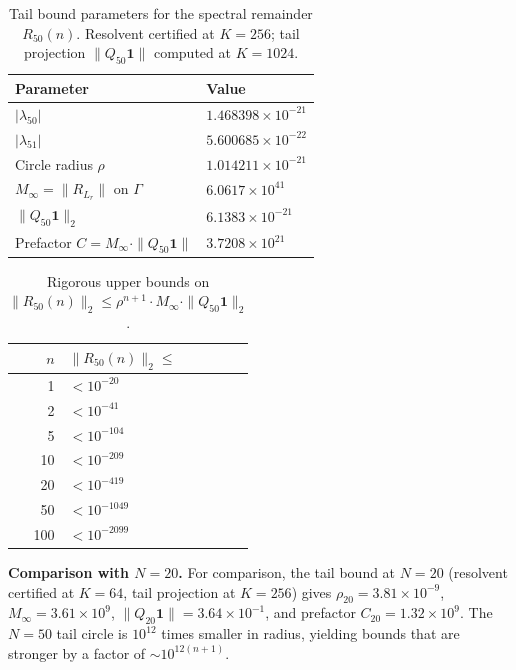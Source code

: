 \documentclass[11pt]{article}
\begin{document}
\begin{table}[ht]
\centering
\caption{Tail bound parameters for the spectral remainder $R_{50}(n)$.
Resolvent certified at $K = 256$; tail projection $\|Q_{50}\mathbf{1}\|$ computed at $K=1024$.}
\label{tab:tail-bound}
\begin{tabular}{ll}
\toprule
Parameter & Value \\
\midrule
$|\lambda_{50}|$ & $1.468398 \times 10^{-21}$ \\
$|\lambda_{51}|$ & $5.600685 \times 10^{-22}$ \\
Circle radius $\rho$ & $1.014211 \times 10^{-21}$ \\
$M_\infty = \|R_{L_r}\|$ on $\Gamma$ & $6.0617 \times 10^{41}$ \\
$\|Q_{50} \mathbf{1}\|_2$ & $6.1383 \times 10^{-21}$ \\
Prefactor $C = M_\infty \cdot \|Q_{50}\mathbf{1}\|$ & $3.7208 \times 10^{21}$ \\
\bottomrule
\end{tabular}
\end{table}

\begin{table}[ht]
\centering
\caption{Rigorous upper bounds on $\|R_{50}(n)\|_2 \leq \rho^{n+1} \cdot M_\infty \cdot \|Q_{50}\mathbf{1}\|_2$.}
\label{tab:tail-bounds-sample}
\begin{tabular}{rl}
\toprule
$n$ & $\|R_{50}(n)\|_2 \leq$ \\
\midrule
1 & $< 10^{-20}$ \\
2 & $< 10^{-41}$ \\
5 & $< 10^{-104}$ \\
10 & $< 10^{-209}$ \\
20 & $< 10^{-419}$ \\
50 & $< 10^{-1049}$ \\
100 & $< 10^{-2099}$ \\
\bottomrule
\end{tabular}
\end{table}

\medskip\noindent
\textbf{Comparison with $N = 20$.}
For comparison, the tail bound at $N = 20$ (resolvent certified at $K = 64$,
tail projection at $K = 256$) gives $\rho_{20} = 3.81 \times 10^{-9}$,
$M_\infty = 3.61 \times 10^{9}$, $\|Q_{20}\mathbf{1}\| = 3.64 \times 10^{-1}$,
and prefactor $C_{20} = 1.32 \times 10^{9}$.
The $N = 50$ tail circle is $10^{12}$ times smaller in radius,
yielding bounds that are stronger by a factor of $\sim 10^{12(n+1)}$.
\end{document}
